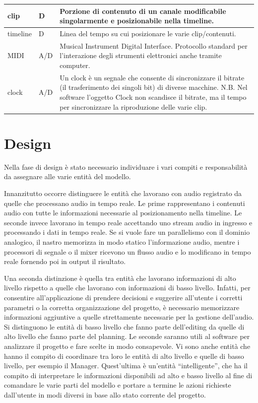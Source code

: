 \documentclass[a4paper,12pt]{report}
\begin{document}
\begin{center}
\begin{longtable}{| m{5em} | m{3cm}| m{7cm} |}
 \hline
 clip & D & Porzione di contenuto di un canale modificabile singolarmente e posizionabile nella timeline. \\
 \hline
 timeline & D & Linea del tempo su cui posizionare le varie clip/contenuti. \\
 \hline
 MIDI & A/D & Musical Instrument Digital Interface.
Protocollo standard per l’interazione degli strumenti elettronici anche tramite computer. \\
\hline
clock & A/D & Un clock è un segnale che consente di sincronizzare il bitrate (il trasferimento dei singoli bit) di diverse macchine.
N.B.
Nel software l’oggetto Clock non scandisce il bitrate, ma il tempo per sincronizzare la riproduzione delle varie clip. \\
\hline
\end{longtable}
\end{center}

\chapter{Design}
Nella fase di design è stato necessario individuare i vari compiti e responsabilità da assegnare alle varie entità del modello.

Innanzitutto occorre distinguere le entità che lavorano con audio registrato da quelle che processano audio in tempo reale.
Le prime rappresentano i contenuti audio con tutte le informazioni necessarie al posizionamento nella timeline. Le seconde invece lavorano in tempo reale accettando uno stream audio in ingresso e processando i dati in tempo reale.
Se si vuole fare un parallelismo con il dominio analogico, il nastro memorizza in modo statico l’informazione audio, mentre i processori di segnale o il mixer ricevono un flusso audio e lo modificano in tempo reale fornendo poi in output il risultato.

Una seconda distinzione è quella tra entità che lavorano informazioni di alto livello rispetto a quelle che lavorano con informazioni di basso livello.
Infatti, per consentire all’applicazione di prendere decisioni e suggerire all’utente i corretti parametri o la corretta organizzazione del progetto, è necessario memorizzare informazioni aggiuntive a quelle strettamente necessarie per la gestione dell’audio.
Si distinguono le entità di basso livello che fanno parte dell’editing da quelle di alto livello che fanno parte del planning. Le seconde saranno utili al software per analizzare il progetto e fare scelte in modo consapevole.
Vi sono anche entità che hanno il compito di coordinare tra loro le entità di alto livello e quelle di basso livello, per esempio il Manager.
Quest’ultima è un'entità “intelligente”, che ha il compito di interpretare le informazioni disponibili ad alto e basso livello al fine di comandare le varie parti del modello e portare a termine le azioni richieste dall’utente in modi diversi in base allo stato corrente del progetto.
\end{document}
